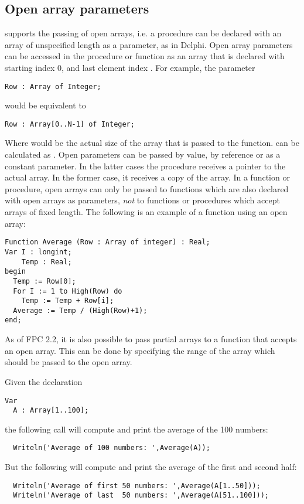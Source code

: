 \subsection{Open array parameters}
\label{se:openarray}
\fpc supports the passing of open arrays, i.e. a procedure can be declared
with an array of unspecified length as a parameter, as in Delphi.
Open array parameters can be accessed in the procedure or function as an
array that is declared with starting index 0, and last element
index .
For example, the parameter
\begin{verbatim}
Row : Array of Integer;
\end{verbatim}
would be equivalent to
\begin{verbatim}
Row : Array[0..N-1] of Integer;
\end{verbatim}
Where   would be the actual size of the array that is passed to the
function.  can be calculated as .
Open parameters can be passed by value, by reference or as a constant
parameter. In the latter cases the procedure receives a pointer to the
actual array. In the former case, it receives a copy of the array.
In a function or procedure, open arrays can only be passed to functions which
are also declared with open arrays as parameters, {\em not} to functions or
procedures which accept arrays of fixed length.
The following is an example of a function using an open array:
\begin{verbatim}
Function Average (Row : Array of integer) : Real;
Var I : longint;
    Temp : Real;
begin
  Temp := Row[0];
  For I := 1 to High(Row) do
    Temp := Temp + Row[i];
  Average := Temp / (High(Row)+1);
end;
\end{verbatim}

As of FPC 2.2, it is also possible to pass partial arrays to a function that
accepts an open array. This can be done by specifying the range of the array
which should be passed to the open array.

Given the declaration
\begin{verbatim}
Var
  A : Array[1..100];
\end{verbatim}
the following call will compute and print the average of the 100 numbers:
\begin{verbatim}
  Writeln('Average of 100 numbers: ',Average(A));
\end{verbatim}
But the following will compute and print the average of the first and second
half:
\begin{verbatim}
  Writeln('Average of first 50 numbers: ',Average(A[1..50]));
  Writeln('Average of last  50 numbers: ',Average(A[51..100]));
\end{verbatim} 

